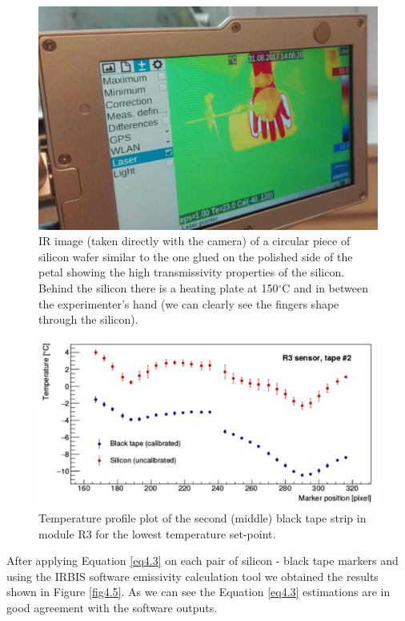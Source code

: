 		\begin{figure}[ht!]
			\centering
			\captionsetup{justification=centering,margin=2cm}
			\includegraphics[scale=0.35]{Figures/Chapter04/HandTransmission.jpg}
			\caption{IR image (taken directly with the camera) of a circular piece of silicon wafer similar to the one glued on the polished side of the petal showing the high transmissivity properties of the silicon. Behind the silicon there is a heating plate at 150$^{\circ}$C and in between the experimenter’s hand (we can clearly see the fingers shape through the silicon).}\label{fig4.3}
		\end{figure}
		
		\begin{figure}[ht!]
			\centering
			\captionsetup{justification=centering,margin=2cm}
			\includegraphics[scale=0.35]{Figures/Chapter04/R3Profile_Si_and_BT.jpg}
			\caption{Temperature profile plot of the second (middle) black tape strip in module R3 for the lowest temperature set-point.}\label{fig4.4}
		\end{figure}
		
		After applying Equation \ref{eq4.3} on each pair of silicon - black tape markers and using the IRBIS software emissivity calculation tool we obtained the results shown in Figure \ref{fig4.5}. As we can see the Equation \ref{eq4.3} estimations are in good agreement with the software outputs. 
		
